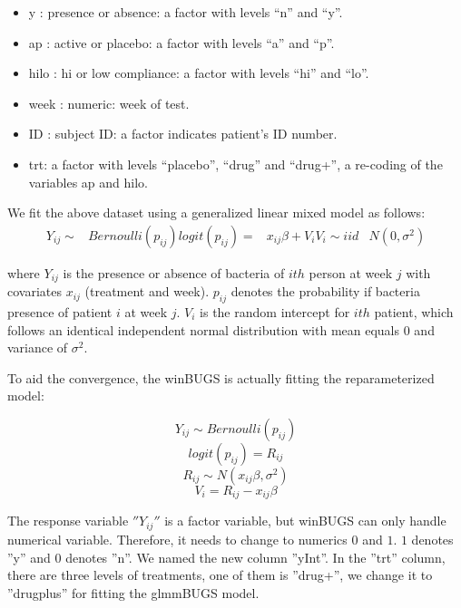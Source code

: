 \documentclass[a4paper]{report}
\begin{document}
\begin{article}
\begin{itemize}
\item y : presence or absence: a factor with levels ``n'' and ``y''.
\item ap : active or placebo: a factor with levels ``a'' and ``p''.
\item hilo : hi or low compliance: a factor with levels ``hi'' and ``lo''.
\item week : numeric: week of test. 
\item ID : subject ID: a factor indicates patient's ID number. 
\item trt: a factor with levels ``placebo'', ``drug'' and ``drug+'', a re-coding of the variables ap and hilo.
\end{itemize} 

We fit the above dataset using a generalized linear mixed model as follows:
\begin{align*}
Y_{ij} \sim & Bernoulli(p_{ij})
logit(p_{ij}) = &x_{ij}\beta + V_{i}
V_{i} \sim iid &N(0, \sigma^2) 
\end{align*}

where $Y_{ij}$ is the presence or absence of bacteria of $ith$ person at week $j$ with covariates $x_{ij}$ (treatment and week).
$p_{ij}$ denotes the probability if bacteria presence of patient $i$ at week $j$.
$V_i$ is the random intercept for $ith$ patient, which follows an identical independent normal distribution with mean equals $0$ and variance of $\sigma^2$.


To aid the convergence, the winBUGS is actually fitting the reparameterized model:

\[Y_{ij} \sim  Bernoulli(p_{ij})\]
\[logit(p_{ij}) = R_{ij}\]
\[R_{ij} \sim N(x_{ij}\beta, \sigma^2)\]
\[V_{i} = R_{ij} - x_{ij}\beta \] 

The response variable $''Y_{ij}''$ is a factor variable, but winBUGS can only handle numerical variable. Therefore, it needs to change to numerics $0$ and $1$. $1$ denotes ''y'' and $0$ denotes ''n''. We named the new column ''yInt''.  In the ''trt'' column, there are three 
levels of treatments, one of them is ''drug+'', we change it to ''drugplus'' for fitting the glmmBUGS model.

\begin{Schunk}
\end{Schunk}


\end{article}
\end{document}
